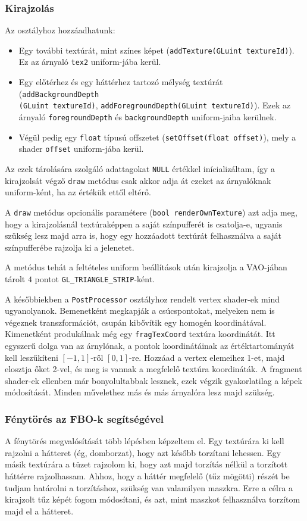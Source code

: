 \subsubsection{Kirajzolás}
Az osztályhoz hozzáadhatunk:
\begin{itemize}
\item Egy további textúrát, mint színes képet (\texttt{addTexture(GLuint textureId)}). Ez az árnyaló \texttt{tex2} uniform-jába kerül.
\item Egy előtérhez és egy háttérhez tartozó mélység textúrát (\texttt{addBackgroundDepth\\(GLuint textureId)}, \texttt{addForegroundDepth(GLuint textureId)}).  Ezek az árnyaló \texttt{foreground\-Depth} és \texttt{backgroundDepth} uniform-jaiba kerülnek.
\item Végül pedig egy \texttt{float} típusú offszetet (\texttt{setOffset(float offset)}), mely a shader \texttt{offset} uniform-jába kerül.
\end{itemize}
Az ezek tárolására szolgáló adattagokat \texttt{NULL} értékkel inícializáltam, így a kirajzolsát végző \texttt{draw} metódus csak akkor adja át ezeket az árnyalóknak uniform-ként, ha az értékük ettől eltérő. 

A \texttt{draw} metódus opcionális paramétere (\texttt{bool renderOwnTexture}) azt adja meg, hogy a kirajzolásnál textúraképpen a saját színpufferét is csatolja-e, ugyanis szükség lesz majd arra is, hogy egy hozzáadott textúrát felhasználva a saját színpufferébe rajzolja ki a jelenetet.

A metódus tehát a feltételes uniform beállítások után kirajzolja a VAO-jában tárolt $4$ pontot \texttt{GL\_TRIANGLE\_STRIP}-ként.

A későbbiekben a \texttt{PostProcessor} osztályhoz rendelt vertex shader-ek mind ugyanolyanok. Bemenetként megkapják a csúcspontokat, melyeken nem is végeznek transzformációt, csupán kibővítik egy homogén koordinátával. Kimenetként produkálnak még egy \texttt{fragTexCoord} textúra koordinátát. Itt egyszerű dolga van az árnylónak, a pontok koordinátáinak az értéktartományát kell leszűkíteni $[-1, 1]$-ről $[0, 1]$-re. Hozzáad a vertex elemeihez 1-et, majd elosztja őket 2-vel, és meg is vannak a megfelelő textúra koordináták. A fragment shader-ek ellenben már bonyolultabbak lesznek, ezek végzik gyakorlatilag a képek módosítását. Minden művelethez más és más árnyalóra lesz majd szükség.

\subsubsection{Fénytörés az FBO-k segítségével}
A fénytörés megvalósítását több lépésben képzeltem el. Egy textúrára ki kell rajzolni a hátteret (ég, domborzat), hogy azt később torzítani lehessen. Egy másik textúrára a tüzet rajzolom ki, hogy azt majd torzítás nélkül a torzított háttérre rajzolhassam. Ahhoz, hogy a háttér megfelelő (tűz mögötti) részét be tudjam határolni a torzításhoz, szükség van valamilyen maszkra. Erre a célra a kirajzolt tűz képét fogom módosítani, és azt, mint maszkot felhasználva torzítom majd el a hátteret. 

